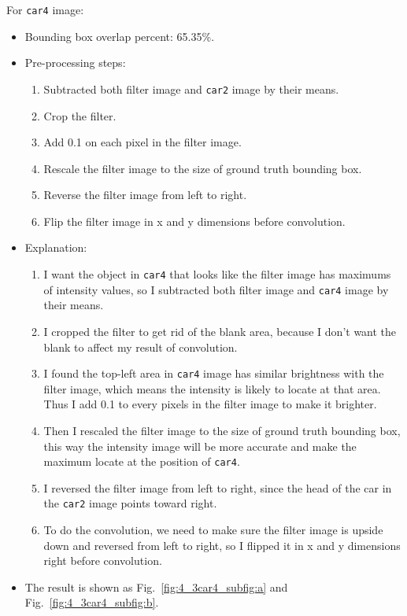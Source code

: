 \documentclass{assignment}
\begin{document}
\begin{problemlist}
For \texttt{car4} image:
\begin{itemize}
    \item Bounding box overlap percent: 65.35\%.
    \item Pre-processing steps: 
    \begin{enumerate}[label={\alph*)}]
        \item Subtracted both filter image and \texttt{car2} image by their means.
        \item Crop the filter.
        \item Add 0.1 on each pixel in the filter image.
        \item Rescale the filter image to the size of ground truth bounding box.
        \item Reverse the filter image from left to right.
        \item Flip the filter image in x and y dimensions before convolution.
    \end{enumerate}
    \item Explanation: 
    \begin{enumerate}[label={\alph*)}]
        \item I want the object in \texttt{car4} that looks like the filter image has maximums of intensity values, so I subtracted both filter image and \texttt{car4} image by their means.
        \item I cropped the filter to get rid of the blank area, because I don't want the blank to affect my result of convolution.
        \item I found the top-left area in \texttt{car4} image has similar brightness with the filter image, which  means the intensity is likely to locate at that area. Thus I add 0.1 to every pixels in the filter image to make it brighter.
        \item Then I rescaled the filter image to the size of ground truth bounding box, this way the intensity image will be more accurate and make the maximum locate at the position of \texttt{car4}.
        \item I reversed the filter image from left to right, since the head of the car in the \texttt{car2} image points toward right.
        \item To do the convolution, we need to make sure the filter image is upside down and reversed from left to right, so I flipped it in x and y dimensions right before convolution.
    \end{enumerate}
    \item The result is shown as Fig.~\ref{fig:4_3car4_subfig:a} and Fig.~\ref{fig:4_3car4_subfig:b}.
\end{itemize}


\end{problemlist}
\end{document}
